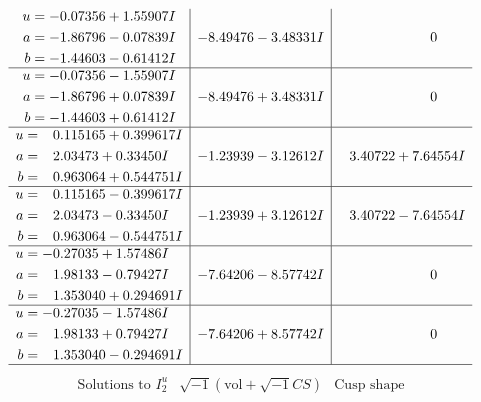 \documentclass[1p]{elsarticle_modified}
\theoremstyle{definition}
\newcommand{\I}{\sqrt{-1}}
\begin{document}
$$\begin{array}{c|c|c}
\begin{aligned}
u &= -0.07356 + 1.55907 I \\
a &= -1.86796 - 0.07839 I \\
b &= -1.44603 - 0.61412 I\end{aligned}
 & -8.49476 - 3.48331 I & \phantom{-0.000000 } 0 \\ \hline\begin{aligned}
u &= -0.07356 - 1.55907 I \\
a &= -1.86796 + 0.07839 I \\
b &= -1.44603 + 0.61412 I\end{aligned}
 & -8.49476 + 3.48331 I & \phantom{-0.000000 } 0 \\ \hline\begin{aligned}
u &= \phantom{-}0.115165 + 0.399617 I \\
a &= \phantom{-}2.03473 + 0.33450 I \\
b &= \phantom{-}0.963064 + 0.544751 I\end{aligned}
 & -1.23939 - 3.12612 I & \phantom{-}3.40722 + 7.64554 I \\ \hline\begin{aligned}
u &= \phantom{-}0.115165 - 0.399617 I \\
a &= \phantom{-}2.03473 - 0.33450 I \\
b &= \phantom{-}0.963064 - 0.544751 I\end{aligned}
 & -1.23939 + 3.12612 I & \phantom{-}3.40722 - 7.64554 I \\ \hline\begin{aligned}
u &= -0.27035 + 1.57486 I \\
a &= \phantom{-}1.98133 - 0.79427 I \\
b &= \phantom{-}1.353040 + 0.294691 I\end{aligned}
 & -7.64206 - 8.57742 I & \phantom{-0.000000 } 0 \\ \hline\begin{aligned}
u &= -0.27035 - 1.57486 I \\
a &= \phantom{-}1.98133 + 0.79427 I \\
b &= \phantom{-}1.353040 - 0.294691 I\end{aligned}
 & -7.64206 + 8.57742 I & \phantom{-0.000000 } 0\\
 \hline 
 \end{array}$$\newpage$$\begin{array}{c|c|c}  
\text{Solutions to }I^u_{2}& \I (\text{vol} + \sqrt{-1}CS) & \text{Cusp shape}\\
 \hline 
\begin{aligned}

\end{aligned}
\end{array}$$
\end{document}
